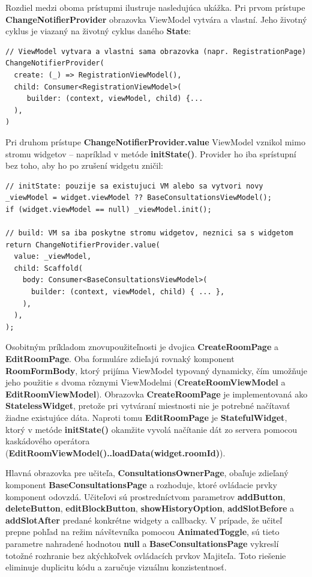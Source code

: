 Rozdiel medzi oboma prístupmi ilustruje nasledujúca ukážka.
Pri prvom prístupe \textbf{ChangeNotifierProvider} obrazovka 
ViewModel vytvára a vlastní. Jeho životný cyklus je viazaný 
na životný cyklus daného \textbf{State}:

\begin{verbatim}
// ViewModel vytvara a vlastni sama obrazovka (napr. RegistrationPage)
ChangeNotifierProvider(
  create: (_) => RegistrationViewModel(),
  child: Consumer<RegistrationViewModel>(
     builder: (context, viewModel, child) {...
  ),
)
\end{verbatim}

Pri druhom prístupe \textbf{ChangeNotifierProvider.value} ViewModel 
vznikol mimo stromu widgetov – napríklad v metóde \textbf{initState()}. Provider ho iba sprístupní bez toho, aby ho po zrušení 
widgetu zničil:
\begin{verbatim}
// initState: pouzije sa existujuci VM alebo sa vytvori novy
_viewModel = widget.viewModel ?? BaseConsultationsViewModel();
if (widget.viewModel == null) _viewModel.init();

// build: VM sa iba poskytne stromu widgetov, neznici sa s widgetom
return ChangeNotifierProvider.value(
  value: _viewModel,
  child: Scaffold(
    body: Consumer<BaseConsultationsViewModel>(
      builder: (context, viewModel, child) { ... },
    ),
  ),
);
\end{verbatim}

Osobitným príkladom znovupoužiteľnosti je dvojica \textbf{CreateRoomPage} a \textbf{EditRoomPage}. Oba formuláre zdieľajú rovnaký komponent \textbf{RoomFormBody}, ktorý prijíma ViewModel typovaný dynamicky, čím umožňuje jeho použitie s dvoma rôznymi ViewModelmi (\textbf{CreateRoomViewModel} a \textbf{EditRoomViewModel}). Obrazovka \textbf{CreateRoomPage} je implementovaná ako \textbf{StatelessWidget}, pretože pri vytváraní miestnosti nie je potrebné načítavať žiadne existujúce dáta. Naproti tomu \textbf{EditRoomPage} je \textbf{StatefulWidget}, ktorý v metóde \textbf{initState()} okamžite vyvolá načítanie dát zo servera pomocou kaskádového operátora (\textbf{EditRoomViewModel()..loadData(widget.roomId)}).

Hlavná obrazovka pre učiteľa, \textbf{ConsultationsOwnerPage}, obaľuje zdieľaný komponent \textbf{BaseConsultationsPage} a rozhoduje, ktoré ovládacie prvky komponent odovzdá. Učiteľovi sú prostredníctvom parametrov \textbf{addButton}, \textbf{deleteButton}, \textbf{editBlockButton},  \textbf{showHistoryOption}, \textbf{addSlotBefore} a \textbf{addSlotAfter} predané konkrétne widgety a callbacky. V prípade, že učiteľ prepne pohľad na režim návštevníka pomocou \textbf{AnimatedToggle}, sú tieto parametre nahradené hodnotou \textbf{null} a \textbf{BaseConsultationsPage} vykreslí totožné rozhranie bez akýchkoľvek ovládacích prvkov Majiteľa. Toto riešenie eliminuje duplicitu kódu a zaručuje vizuálnu konzistentnosť.

